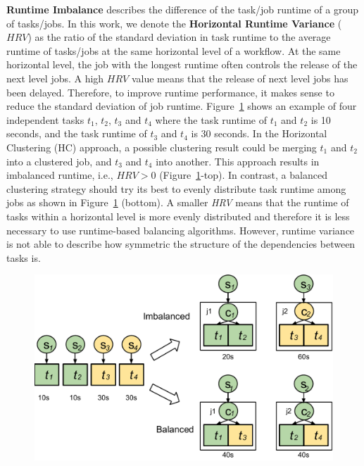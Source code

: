 \textbf{Runtime Imbalance} describes the difference of the task/job runtime of a group of tasks/jobs. In this work, we denote the \textbf{Horizontal Runtime Variance} ($HRV$) as the ratio of the standard deviation in task runtime to the average runtime of tasks/jobs at the same horizontal level of a workflow. At the same horizontal level, the job with the longest runtime often controls the release of the next level jobs. A high $HRV$ value means that the release of next level jobs has been delayed. Therefore, to improve runtime performance, it makes sense to reduce the standard deviation of job runtime. Figure~\ref{fig:imbalance_rv} shows an example of four independent tasks $t_1$, $t_2$, $t_3$ and $t_4$ where the task runtime of $t_1$ and $t_2$ is 10 seconds, and the task runtime of $t_3$ and $t_4$ is 30 seconds. In the Horizontal Clustering (HC) approach, a possible clustering result could be merging $t_1$ and $t_2$ into a clustered job, and $t_3$ and $t_4$ into another. This approach results in imbalanced runtime, i.e., $HRV > 0$ (Figure~\ref{fig:imbalance_rv}-top). In contrast, a balanced clustering strategy should try its best to evenly distribute task runtime among jobs as shown in Figure~\ref{fig:imbalance_rv} (bottom). A smaller \emph{HRV} means that the runtime of tasks within a horizontal level is more evenly distributed and therefore it is less necessary to use runtime-based balancing algorithms. However, runtime variance is not able to describe how symmetric the structure of the dependencies between tasks is.

\begin{figure}[htb]
	\centering
	\includegraphics[width=0.8\linewidth]{figures/balance/figure5.pdf}
	\label{fig:imbalance_rv}
\end{figure}


